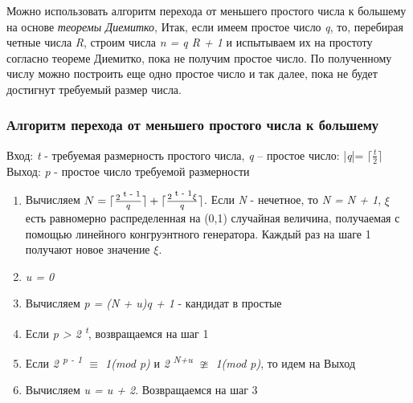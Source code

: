 \begin{comment}
  Если число \textit{N} выдержало все тесты на простоту, то появляется надежда на то, что \textit{N} - простое число, и следует попытаться 
  доказать простоту с помощью \textit{теоремы Диемитко}. Для этого можно случайным образом выбирать число \textit{a, 1 < a < N},
  и проверять для него выполнимость соотношений

  \begin{equation}
    \textit{a\textsuperscript{ N - 1} {$\equiv$} (mod N), (a\textsuperscript{ R} - 1, N) = 1}.
  \end{equation}
  
  Если при выбранном \textit{a} эти соотношения выполняются, то, согласно следствию из \textit{теоремы Диемитко}, можно 
  утверждать, что число \textit{N} простое. Если же эти условия нарушаются, нужно выбрать другое значение \textit{a} и повторять 
  эти операции до тех пор, пока такое число не будет обнаружено.
  \end{comment}
  
  Можно использовать алгоритм перехода от меньшего простого числа к большему на основе \textit{теоремы Диемитко},
  Итак, если имеем простое число \textit{q}, то, перебирая четные числа \textit{R}, строим числа \textit{n = q R + 1} и испытываем их на 
  простоту согласно теореме Диемитко, пока не получим простое число. По полученному числу можно построить еще одно простое число и так далее,
  пока не будет достигнут требуемый размер числа. 

  
  \subsubsection{Алгоритм перехода от меньшего простого числа к большему}
    Вход: \textit{t} - требуемая размерность простого числа, \textit{q} – простое число: |\textit{q}|= \textit{{$\lceil \frac{t}{2} \rceil$}}
    Выход: \textit{p} - простое число требуемой размерности
    
      \begin{enumerate}
      \item Вычисляем \textit{{$N = \lceil \frac{2\textsuperscript{ t - 1}}{q} \rceil + \lceil \frac{2\textsuperscript{ t - 1} \xi}{q} \rceil$}}. 
      Если \textit{N} - нечетное, то \textit{N = N + 1}, \textit{{$\xi$}} есть равномерно распределенная на (0,1) случайная величина, получаемая с помощью 
      линейного конгруэнтного генератора. Каждый раз на шаге 1 получают новое значение \textit{{$\xi$}}.
      \item \textit{u = 0}
      \item Вычисляем \textit{p = (N + u)q + 1} - кандидат в простые
      \item Если \textit{p > 2\textsuperscript{ t}}, возвращаемся на шаг 1
      \item Если \textit{2\textsuperscript{ p - 1} {$\equiv$} 1(mod p)} и \textit{2\textsuperscript{ N+u} {$\ncong$} 1(mod p)}, то идем на Выход
      \item Вычисляем \textit{u = u + 2}. Возвращаемся на шаг 3
      \end{enumerate}
      
